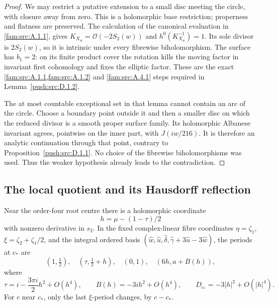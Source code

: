 \begin{proof}
We may restrict a putative extension to a small disc meeting the
circle, with closure away from zero. This is a holomorphic base
restriction; properness and flatness are preserved. The calculation
of the canonical evaluation in \cref{fam:src:A.1.1}, gives
\(K_{X_w}=\mathcal O(-2S_2(w))\) and
\(h^0(K_{X_w}^{-1})=1\). Its sole divisor is \(2S_2(w)\), so it is
intrinsic under every fibrewise biholomorphism. The surface has
\(b_1=2\): on its finite product cover the rotation kills the moving
factor in invariant first cohomology and fixes the elliptic factor.
These are the exact \cref{fam:src:A.1.1,fam:src:A.1.2} and \cref{fam:src:A.4.1} steps required in Lemma~\ref{push:src:D.1.2}.

The at most countable exceptional set in that lemma cannot contain
an arc of the circle. Choose a boundary point outside it and then a smaller disc
on which the reduced divisor is a smooth proper surface family. Its
holomorphic Albanese invariant agrees, pointwise on the inner part,
with \(J(iw/216)\). It is therefore an analytic continuation through
that point, contrary to Proposition~\ref{push:src:D.1.1}. No choice of the
fibrewise biholomorphisms was used. Thus the weaker hypothesis already
leads to the contradiction.
\end{proof}

\subsection{The local quotient and its Hausdorff reflection}\label{push:section:D.2}

\begin{lemma}\label{push:src:D.2.1}
Near the order-four root centre there is a holomorphic coordinate
\[
 h=\mu-(1-\tau)/2
\]
with nonzero derivative in \(s_2\). In the fixed complex-linear fibre
coordinates \(\eta=\zeta_1\), \(\xi=\zeta_2+\zeta_1/2\), and the
integral ordered basis
\((\widehat w,\widehat u,\widehat\delta,
\widehat\gamma+3\widehat u-3\widehat w)\), the periods at \(c_*\) are
\begin{equation}\label{eq:d-period-normal}
 (1,\tfrac12),\quad(\tau,\tfrac12+h),\quad(0,1),\quad(6h,a+B(h)),
\end{equation}
where
\[
 \tau=i-\frac{3\pi i}{2}h^2+O(h^4),\qquad
 B(h)=-3ih^2+O(h^4),\qquad
 D_{c_*}=-3|h|^2+O(|h|^4).
\]
For \(c\) near \(c_*\), only the last \(\xi\)-period changes, by
\(c-c_*\).
\end{lemma}

